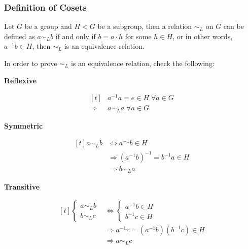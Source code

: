 \documentclass[a4paper,12pt]{article}
\begin{document}
\subsubsection{Definition of Cosets}
\begin{pst}
  Let $G$ be a group and $H<G$ be a subgroup, then a relation $\sim_{L}$ on $G$ can be defined as $a\sim_{L}b$ if and only if $b=a\cdot h$ for some $h\in H$, or in other words, $a^{-1}b\in H$, then $\sim_{L}$ is an equivalence relation.\n

  \prf In order to prove $\sim_{L}$ is an equivalence relation, check the following:

  \begin{alist}
    \item \textbf{Reflexive}

    $$\begin{aligned}[t]
      &a^{-1}a=e\in H\;\forall a\in G\\
      \Rightarrow&a\sim_{L}a\;\forall a\in G
    \end{aligned}$$

    \propdisp

    \item \textbf{Symmetric}

    $$\begin{aligned}[t]
      a\sim_{L}b&\Leftrightarrow a^{-1}b\in H\\
      &\Rightarrow (a^{-1}b)^{-1}=b^{-1}a\in H\\
      &\Rightarrow b\sim_{L}a
    \end{aligned}$$

    \item \textbf{Transitive}

    $$\begin{aligned}[t]
      \begin{cases}
        a\sim_{L}b\\
        b\sim_{L}c
      \end{cases}&\Leftrightarrow\begin{cases}
        a^{-1}b\in H\\
        b^{-1}c\in H
      \end{cases}\\
      &\Rightarrow a^{-1}c=(a^{-1}b)(b^{-1}c)\in H\\
      &\Rightarrow a\sim_{L}c
    \end{aligned}$$

  \end{alist}
\end{pst}\n
\end{document}
